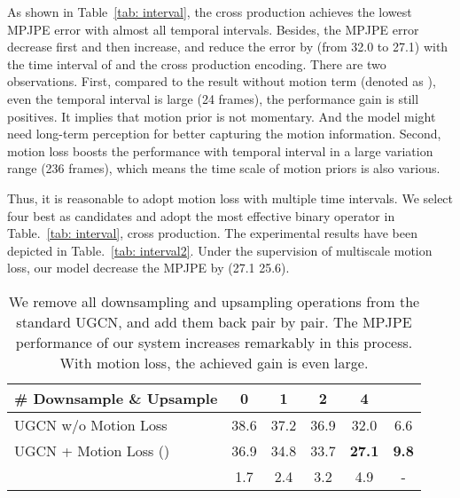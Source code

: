\documentclass[runningheads]{llncs}
\begin{document}
    As shown in Table~\ref{tab: interval},
    the cross production achieves the lowest MPJPE error with almost all temporal intervals.
    Besides, the MPJPE error decrease first and then increase,
    and reduce the error by  (from 32.0 to 27.1) with the time interval of  and the cross production encoding.
    There are two observations.
    First, compared to the result without motion term (denoted as ), even the temporal interval is large (24 frames),
    the performance gain is still positives. It implies that motion prior is not momentary.
    And the model might need long-term perception for better capturing the motion information.
    Second, motion loss boosts the performance with temporal interval  in a large variation range (236 frames),
    which means the time scale of motion priors is also various.


    Thus, it is reasonable to adopt motion loss with multiple time intervals.
    We select four best  as candidates and adopt the most effective binary operator in Table.~\ref{tab: interval}, cross production.
The experimental results have been depicted in Table.~\ref{tab: interval2}.
    Under the supervision of multiscale motion loss,
    our model decrease the MPJPE by  (27.1  25.6).


\begin{table}[htb]
\scriptsize
\setlength{\tabcolsep}{0.39em}
\centering
\caption {We remove all downsampling and upsampling operations from the standard UGCN, and add them back pair by pair. The MPJPE performance of our system increases remarkably in this process. With motion loss, the achieved gain is even large.}
\label{tab: downsample}
\begin{tabular}{@{}l|cccc|c@{}}
\toprule
\# Downsample \& Upsample   & 0& 1 & 2 & 4 &\\
\midrule
UGCN w/o Motion Loss      & 38.6 & 37.2 & 36.9 & 32.0 &6.6   \\
UGCN + Motion Loss () & 36.9 & 34.8 & 33.7 & \textbf{27.1} & \textbf{9.8}\\
\midrule
 & 1.7 & 2.4 & 3.2 & 4.9& -\\
\bottomrule
\end{tabular}
\end{table}
\end{document}
